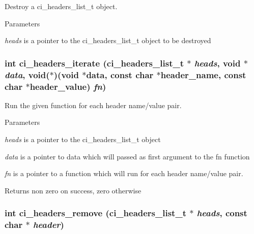 Destroy a ci\_\-headers\_\-list\_\-t object. 
\begin{DoxyParams}{Parameters}
\item[{\em heads}]is a pointer to the ci\_\-headers\_\-list\_\-t object to be destroyed \end{DoxyParams}
\hypertarget{group__HEADERS_ga3481363b97dcfaaf8af07d4fddb9704c}{
\subsubsection[{ci\_\-headers\_\-iterate}]{\setlength{\rightskip}{0pt plus 5cm}int ci\_\-headers\_\-iterate ({\bf ci\_\-headers\_\-list\_\-t} $\ast$ {\em heads}, \/  void $\ast$ {\em data}, \/  void($\ast$)(void $\ast$data, const char $\ast$header\_\-name, const char $\ast$header\_\-value) {\em fn})}}
\label{group__HEADERS_ga3481363b97dcfaaf8af07d4fddb9704c}


Run the given function for each header name/value pair. 
\begin{DoxyParams}{Parameters}
\item[{\em heads}]is a pointer to the ci\_\-headers\_\-list\_\-t object \item[{\em data}]is a pointer to data which will passed as first argument to the fn function \item[{\em fn}]is a pointer to a function which will run for each header name/value pair. \end{DoxyParams}
\begin{DoxyReturn}{Returns}
non zero on success, zero otherwise 
\end{DoxyReturn}
\hypertarget{group__HEADERS_ga852cd720c302a7d1b835f63364709e09}{
\subsubsection[{ci\_\-headers\_\-remove}]{\setlength{\rightskip}{0pt plus 5cm}int ci\_\-headers\_\-remove ({\bf ci\_\-headers\_\-list\_\-t} $\ast$ {\em heads}, \/  const char $\ast$ {\em header})}}
\label{group__HEADERS_ga852cd720c302a7d1b835f63364709e09}


